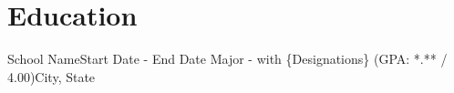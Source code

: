 \section{Education}
    \resumeSubHeadingListStart

    \resumeSubheading
    {School Name}{Start Date - End Date}
    {Major - with \{Designations\} (GPA: *.** / 4.00)}{City, State}
    \resumeItemListStart
    \resumeItemListEnd

    \resumeSubHeadingListEnd